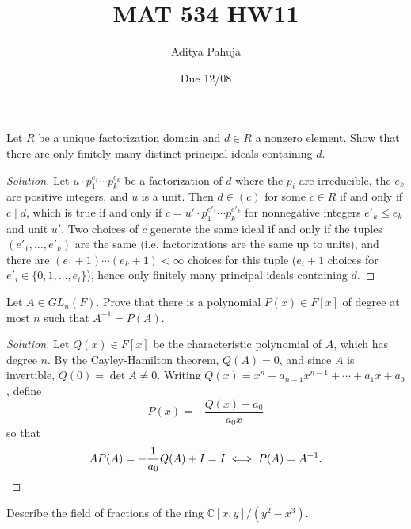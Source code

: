 \documentclass[10pt]{article}
\title{MAT 534 HW11}
\author{\large Aditya Pahuja}
\date{\large Due 12/08}
\providecommand{\CC}{\mathbb C}
\providecommand{\inv}{^{-1}}
\newenvironment{soln}{\begin{proof}[Solution]}{\end{proof}}
\begin{document}
\maketitle

\begin{problem}
    Let $R$ be a unique factorization domain and $d\in R$ a nonzero element.
    Show that there are only finitely many distinct principal ideals containing $d$.
\end{problem}

\begin{soln}
    Let $u\cdot p_1^{e_1}\cdots p_k^{e_k}$ be a factorization of $d$
    where the $p_i$ are irreducible, the $e_k$ are positive integers,
    and $u$ is a unit.
    Then $d\in (c)$ for some $c\in R$ if and only if $c\mid d$,
    which is true if and only if $c = u'\cdot p_1^{e'_1}\cdots p_k^{e'_k}$
    for nonnegative integers $e'_k\le e_k$ and unit $u'$.
    Two choices of $c$ generate the same ideal if and only if
    the tuples $(e'_1,\dots,e'_k)$ are the same
    (i.e. factorizations are the same up to units),
    and there are $(e_1 + 1)\cdots(e_k+1) < \infty$ choices
    for this tuple ($e_i + 1$ choices for $e'_i\in\{0,1,\dots,e_i\}$),
    hence only finitely many principal ideals containing $d$.
\end{soln}

\begin{problem}
    Let $A\in GL_n(F)$. Prove that there is a polynomial $P(x)\in F[x]$
    of degree at most $n$ such that $A\inv = P(A)$.
\end{problem}

\begin{soln}
    Let $Q(x)\in F[x]$ be the characteristic polynomial of $A$,
    which has degree $n$.
    By the Cayley-Hamilton theorem, $Q(A) = 0$,
    and since $A$ is invertible, $Q(0) = \det A \ne 0$.
    Writing $Q(x) = x^n + a_{n-1}x^{n-1} + \cdots + a_1x + a_0$, define
    \begin{equation*}
	P(x) = -\frac{Q(x) - a_0}{a_0x}
    \end{equation*}
    so that
    \begin{equation*}
	AP(A) = -\frac 1{a_0}Q(A) + I = I
	\iff P(A) = A\inv.\qedhere
    \end{equation*}
\end{soln}

\begin{problem}
    Describe the field of fractions of the ring $\CC[x,y]/(y^2-x^3)$.
\end{problem}
\end{document}
